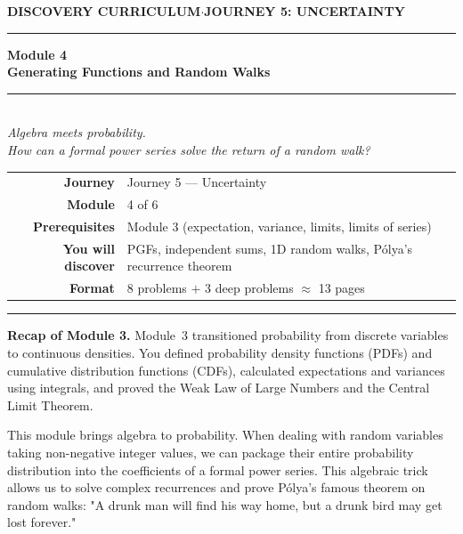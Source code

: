 \documentclass[12pt, a4paper]{article}
\newcounter{problem}
\begin{document}
\thispagestyle{empty}
\begin{center}
{\small\color{MidBlue}\textbf{DISCOVERY CURRICULUM}\quad$\cdot$\quad\textbf{JOURNEY 5: UNCERTAINTY}}
\vspace{0.6cm}

{\color{NavyBlue}\rule{\linewidth}{2pt}}\vspace{0.5cm}

{\Huge\bfseries\color{NavyBlue}Module 4}\\[0.3cm]
{\LARGE\bfseries\color{MidBlue}Generating Functions and Random Walks}\\[0.4cm]
{\color{Gold}\rule{0.4\linewidth}{1.2pt}}\\[0.4cm]
{\large\itshape\color{DarkGrey}
Algebra meets probability.\\[0.15cm]
How can a formal power series solve the return of a random walk?}

\vspace{1cm}
\begin{tabular}{rl}
\color{DarkGrey}\textbf{Journey}           & Journey 5 --- Uncertainty \\[4pt]
\color{DarkGrey}\textbf{Module}            & 4 of 6 \\[4pt]
\color{DarkGrey}\textbf{Prerequisites}     & Module 3 (expectation, variance, limits, limits of series) \\[4pt]
\color{DarkGrey}\textbf{You will discover} & PGFs, independent sums, 1D random walks, Pólya's recurrence theorem \\[4pt]
\color{DarkGrey}\textbf{Format}            & 8 problems $+$ 3 deep problems $\approx$ 13 pages \\
\end{tabular}
\vspace{1cm}

{\color{NavyBlue}\rule{\linewidth}{2pt}}
\end{center}

\vspace{0.5cm}
\noindent\textbf{Recap of Module 3.}
Module~3 transitioned probability from discrete variables to continuous densities. You defined probability density functions (PDFs) and cumulative distribution functions (CDFs), calculated expectations and variances using integrals, and proved the Weak Law of Large Numbers and the Central Limit Theorem.

\medskip
This module brings algebra to probability. When dealing with random variables taking non-negative integer values, we can package their entire probability distribution into the coefficients of a formal power series. This algebraic trick allows us to solve complex recurrences and prove Pólya's famous theorem on random walks: "A drunk man will find his way home, but a drunk bird may get lost forever."
\end{document}
